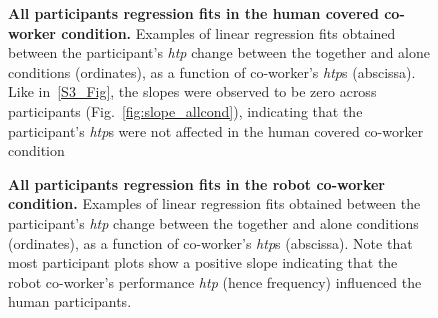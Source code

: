 \begin{figure}[hpt]
	\caption{{\bf All participants regression fits in the human covered co-worker condition.} Examples of linear regression fits obtained between the participant's {\it htp} change between the together and alone conditions (ordinates), as a function of co-worker's {\it htp}s (abscissa). Like in~\ref{S3_Fig}, the slopes were observed to be zero across participants (Fig.~\ref{fig:slope_allcond}), indicating that  the participant's {\it htp}s were not affected in the human covered co-worker condition}
	\label{S4_Fig}
\end{figure}

\begin{figure}
	\caption{{\bf All participants regression fits in the robot co-worker condition.} Examples of linear regression fits obtained between the participant's {\it htp} change between the together and alone conditions (ordinates), as a function of co-worker's {\it htp}s (abscissa).  Note that most participant plots show a positive slope indicating that the robot co-worker's performance {\it htp} (hence frequency) influenced the human participants.}
	\label{S1_Fig}
\end{figure}

